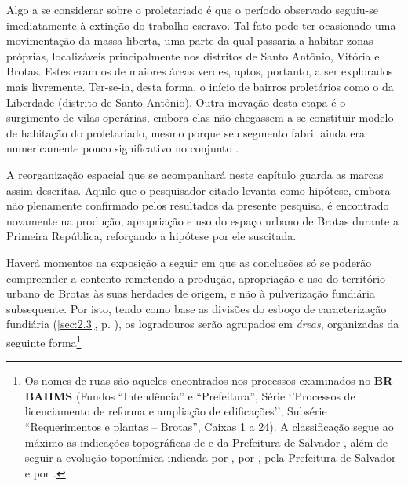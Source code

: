 \begin{citacao}
Algo a se considerar sobre o proletariado é que o período observado seguiu-se imediatamente à extinção do trabalho escravo. Tal fato pode ter ocasionado uma movimentação da massa liberta, uma parte da qual passaria a habitar zonas próprias, localizáveis principalmente nos distritos de Santo Antônio, Vitória e Brotas. Estes eram os de maiores áreas verdes, aptos, portanto, a ser explorados mais livremente. Ter-se-ia, desta forma, o início de bairros proletários como o da Liberdade (distrito de Santo Antônio). Outra inovação desta etapa é o surgimento de vilas operárias, embora elas não chegassem a se constituir modelo de habitação do proletariado, mesmo porque seu segmento fabril ainda era numericamente pouco significativo no conjunto \cite[pp.~21-22]{santos_habitacao_1990}.
\end{citacao}

A reorganização espacial que se acompanhará neste capítulo guarda as marcas assim descritas. Aquilo que o pesquisador citado levanta como hipótese, embora não plenamente confirmado pelos resultados da presente pesquisa, é encontrado novamente na produção, apropriação e uso do espaço urbano de Brotas durante a Primeira República, reforçando a hipótese por ele suscitada.

Haverá momentos na exposição a seguir em que as conclusões só se poderão compreender a contento remetendo a produção, apropriação e uso do território urbano de Brotas às suas herdades de origem, e não à pulverização fundiária subsequente. Por isto, tendo como base as divisões do esboço de caracterização fundiária (\autoref{sec:2.3}, p. \pageref{sec:2.3}), os logradouros serão agrupados em \textit{áreas}, organizadas da seguinte forma\footnote{Os nomes de ruas são aqueles encontrados nos processos examinados no \textbf{BR BAHMS} (Fundos ``Intendência'' e ``Prefeitura'', Série `'Processos de licenciamento de reforma e ampliação de edificações'', Subsérie ``Requerimentos e plantas -- Brotas'', Caixas 1 a 24). A classificação segue ao máximo as indicações topográficas de  e da Prefeitura de Salvador \cite{municipal_atlas_1955}, além de seguir a evolução toponímica indicada por , por , pela Prefeitura de Salvador \citeyear{municipal_atlas_1955} e por .}

